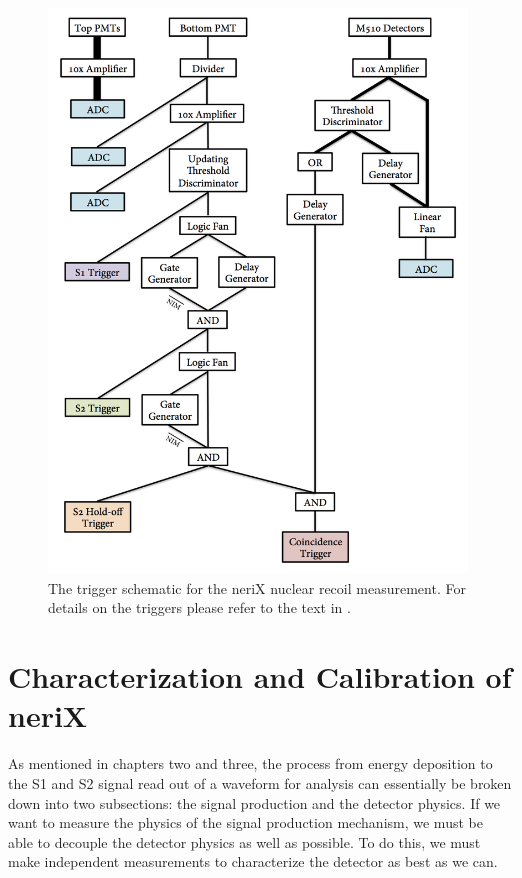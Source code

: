 \begin{figure}[p]
        \centering
	\includegraphics[width=0.99\textwidth]{nerix_daq_trigger_setup}
	\caption{The trigger schematic for the neriX nuclear recoil measurement.  For details on the triggers please refer to the text in .}
	\label{fig:nerix_daq_trigger_setup}
\end{figure}

\section{Characterization and Calibration of neriX}

As mentioned in chapters two and three, the process from energy deposition to the S1 and S2 signal read out of a waveform for analysis can essentially be broken down into two subsections: the signal production and the detector physics.  If we want to measure the physics of the signal production mechanism, we must be able to decouple the detector physics as well as possible.  To do this, we must make independent measurements to characterize the detector as best as we can.  


